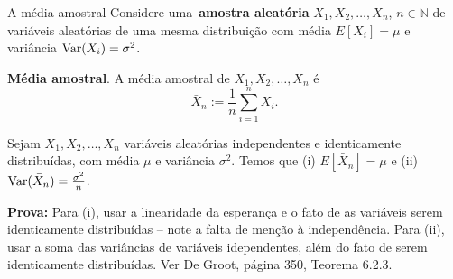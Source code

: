 \begin{frame}{A média amostral}
Considere uma~\textbf{amostra aleatória} $X_1, X_2, \ldots, X_n$, $n \in \mathbb{N}$ de variáveis aleatórias de uma mesma distribuição com média $E[X_i] = \mu$ e variância $\operatorname{Var}(X_i) = \sigma^2$.
\begin{defn}
 \textbf{Média amostral}. A média amostral de $X_1, X_2, \ldots, X_n$ é
 \begin{equation}
  \label{eq:sample_mean}
  \bar{X}_n := \frac{1}{n} \sum_{i = 1}^n X_i.
 \end{equation}
\end{defn}

\begin{theo}
\label{thm:iid_properties}
Sejam  $X_1, X_2, \ldots, X_n$ variáveis aleatórias independentes e identicamente distribuídas, com média $\mu$ e variância $\sigma^2$.
Temos que (i) $E[\bar{X}_n] = \mu$ e (ii) $\operatorname{Var}(\bar{X}_n) = \frac{\sigma^2}{n}$.
\end{theo}
\textbf{Prova:} Para (i), usar a linearidade da esperança e o fato de as variáveis serem identicamente distribuídas -- note a falta de menção à independência.
Para (ii), usar a soma das variâncias de variáveis idependentes, além do fato de serem identicamente distribuídas.
Ver De Groot, página 350, Teorema 6.2.3.
\end{frame}
